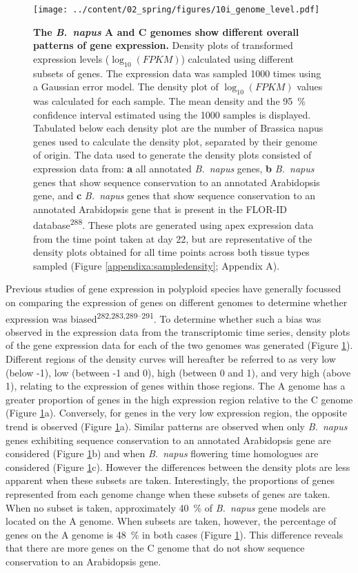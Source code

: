 \documentclass[12pt,]{book}
\begin{document}
\begin{figure}[htbp]
\centering
\texttt{[image: ../content/02\_spring/figures/10i\_genome\_level.pdf]}
\caption{\textbf{The \emph{B.~napus} A and C genomes show different
overall patterns of gene expression.} Density plots of transformed
expression levels (\(\log_{10}(FPKM)\)) calculated using different
subsets of genes. The expression data was sampled 1000 times using a
Gaussian error model. The density plot of \(\log_{10}(FPKM)\) values was
calculated for each sample. The mean density and the 95~\% confidence
interval estimated using the 1000 samples is displayed. Tabulated below
each density plot are the number of Brassica napus genes used to
calculate the density plot, separated by their genome of origin. The
data used to generate the density plots consisted of expression data
from: \textbf{a} all annotated \emph{B.~napus} genes, \textbf{b}
\emph{B.~napus} genes that show sequence conservation to an annotated
Arabidopsis gene, and \textbf{c} \emph{B.~napus} genes that show
sequence conservation to an annotated Arabidopsis gene that is present
in the FLOR-ID database\textsuperscript{288}. These plots are generated
using apex expression data from the time point taken at day 22, but are
representative of the density plots obtained for all time points across
both tissue types sampled (Figure \ref{appendixa:sampledensity};
Appendix A).}\label{figure:210:genomeexp}
\end{figure}

Previous studies of gene expression in polyploid species have generally
focussed on comparing the expression of genes on different genomes to
determine whether expression was
biased\textsuperscript{282,283,289--291}. To determine whether such a
bias was observed in the expression data from the transcriptomic time
series, density plots of the gene expression data for each of the two
genomes was generated (Figure \ref{figure:210:genomeexp}). Different
regions of the density curves will hereafter be referred to as very low
(below -1), low (between -1 and 0), high (between 0 and 1), and very
high (above 1), relating to the expression of genes within those
regions. The A genome has a greater proportion of genes in the high
expression region relative to the C genome (Figure
\ref{figure:210:genomeexp}a). Conversely, for genes in the very low
expression region, the opposite trend is observed (Figure
\ref{figure:210:genomeexp}a). Similar patterns are observed when only
\emph{B.~napus} genes exhibiting sequence conservation to an annotated
Arabidopsis gene are considered (Figure \ref{figure:210:genomeexp}b) and
when \emph{B.~napus} flowering time homologues are considered (Figure
\ref{figure:210:genomeexp}c). However the differences between the
density plots are less apparent when these subsets are taken.
Interestingly, the proportions of genes represented from each genome
change when these subsets of genes are taken. When no subset is taken,
approximately 40~\% of \emph{B.~napus} gene models are located on the A
genome. When subsets are taken, however, the percentage of genes on the
A genome is 48~\% in both cases (Figure \ref{figure:210:genomeexp}).
This difference reveals that there are more genes on the C genome that
do not show sequence conservation to an Arabidopsis gene.
\end{document}
